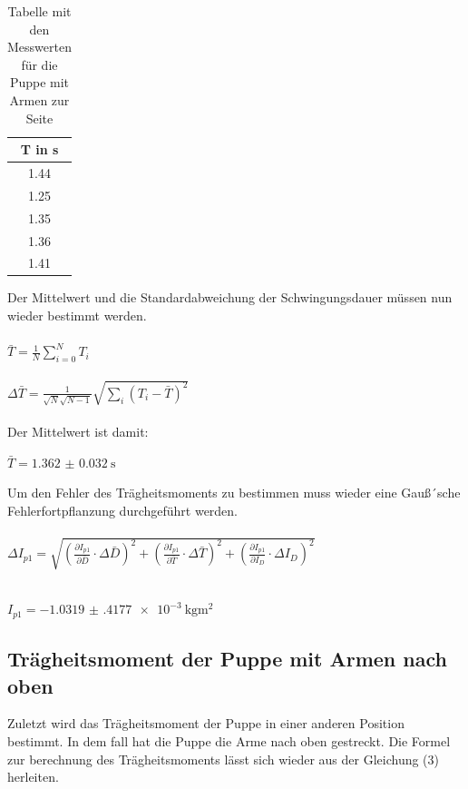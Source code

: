 \begin{table}[H]
  \centering
  \caption{Tabelle mit den Messwerten für die Puppe mit Armen zur Seite}
  \begin{tabular}{c}
    \toprule
    T in \si{\second} \\
    \midrule
    1.44 \\
    1.25 \\
    1.35 \\
    1.36 \\
    1.41 \\
    \bottomrule
  \end{tabular}
\end{table}

Der Mittelwert und die Standardabweichung der Schwingungsdauer müssen nun wieder
bestimmt werden.\\\\

$\bar{T} = \frac{1}{N} \sum_{i=0}^{N} T_i$ \\\\

$\Delta \bar{T} = \frac{1}{\sqrt{N}\sqrt{N-1}} \sqrt{\sum_{i}(T_i-\bar{T})^2}$\\\\

Der Mittelwert ist damit:

\centerline{$\bar{T} = \SI{1.362(32)}{\second}$}

Um den Fehler des Trägheitsmoments zu bestimmen muss wieder eine Gauß´sche
Fehlerfortpflanzung durchgeführt werden.\\\\

$\Delta I_{p1} = \sqrt{\left(\frac{\partial I_{p1}}{\partial \bar{D}} \cdot \Delta \bar{D} \right)^2
 + \left(\frac{\partial I_{p1}}{\partial \bar{T}} \cdot \Delta \bar{T} \right)^2
  + \left(\frac{\partial I_{p1}}{\partial I_D} \cdot \Delta I_D \right)^2}$\\\\

\centerline{$I_{p1} = \SI{-1.0319(4177)e-3}{\kilo\gram\meter\squared}$}

\subsection{Trägheitsmoment der Puppe mit Armen nach oben}

Zuletzt wird das Trägheitsmoment der Puppe in einer anderen Position bestimmt. In dem
fall hat die Puppe die Arme nach oben gestreckt. Die Formel zur berechnung des
Trägheitsmoments lässt sich wieder aus der Gleichung (3) herleiten.

